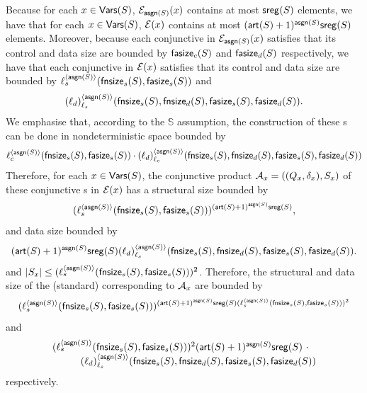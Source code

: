 Because for each $x \in \mathsf{Vars}(S)$, $\mathcal{E}_{\mathsf{asgn}(S)}(x)$ contains at most $\mathsf{sreg}(S)$ elements, we have that for each $x \in \mathsf{Vars}(S)$, $\mathcal{E}(x)$ contains at most $(\mathsf{art}(S)+1)^{\mathsf{asgn}(S)}\mathsf{sreg}(S)$ elements. 
Moreover, because each conjunctive \SA{} in $\mathcal{E}_{\mathsf{asgn}(S)}(x)$ satisfies that its control and data size are bounded by $\mathsf{fasize}_c(S)$ and $\mathsf{fasize}_d(S)$ respectively, 
we have that each conjunctive \SA{} in $\mathcal{E}(x)$ satisfies that its control and data size are bounded by $\ell_s^{\langle \mathsf{asgn}(S) \rangle}(\mathsf{fnsize}_s(S), \mathsf{fasize}_s(S))$ and 
%
\[ (\ell_d)^{\langle  \mathsf{asgn}(S) \rangle}_{\ell_s}(\mathsf{fnsize}_s(S), \mathsf{fnsize}_d(S), \mathsf{fasize}_s(S), \mathsf{fasize}_d(S)).\]
% 
We emphasise that, according to the $\mathbb{S}$\prerec{} assumption, the construction of these \SA{}s can be done in nondeterministic space bounded by
%
{
\small
$$\ell_c^{\langle  \mathsf{asgn}(S) \rangle}(\mathsf{fnsize}_s(S), \mathsf{fasize}_s(S)) \cdot (\ell_d)^{\langle \mathsf{asgn}(S) \rangle}_{\ell_c}(\mathsf{fnsize}_s(S),  \mathsf{fnsize}_d(S), \mathsf{fasize}_s(S), \mathsf{fasize}_d(S))$$
}
%
Therefore, for each $x \in \mathsf{Vars}(S)$, the conjunctive product \SA{} $\mathcal{A}_x=((Q_x, \delta_x), S_x)$ of these conjunctive \SA{}s  in $\mathcal{E}(x)$ has a structural size bounded by 
%
$$(\ell^{\langle \mathsf{asgn}(S) \rangle}_s(\mathsf{fnsize}_s(S), \mathsf{fasize}_s(S)))^{(\mathsf{art}(S)+1)^{\mathsf{asgn}(S)} \mathsf{sreg}(S)},$$
%
and data size bounded by
%
\[ (\mathsf{art}(S)+1)^{\mathsf{asgn}(S)} \mathsf{sreg}(S) (\ell_d)^{\langle  \mathsf{asgn}(S) \rangle}_{\ell_s}(\mathsf{fnsize}_s(S),\mathsf{fnsize}_d(S),  \mathsf{fasize}_s(S), \mathsf{fasize}_d(S)).\]
%
and $|S_x| \le (\ell_s^{\langle \mathsf{asgn}(S) \rangle}(\mathsf{fnsize}_s(S), \mathsf{fasize}_s(S)))^2$. 
Therefore, the structural and data size of the (standard) \SA{} corresponding to $\mathcal{A}_x$ are  bounded by 
%
$$(\ell^{\langle \mathsf{asgn}(S) \rangle}_s(\mathsf{fnsize}_s(S), \mathsf{fasize}_s(S)))^{(\mathsf{art}(S)+1)^{\mathsf{asgn}(S)} \mathsf{sreg}(S) (\ell_s^{\langle \mathsf{asgn}(S) \rangle}(\mathsf{fnsize}_s(S), \mathsf{fasize}_s(S)))^2}$$
%
and
$$
\begin{array}{l}
(\ell_s^{\langle \mathsf{asgn}(S) \rangle}(\mathsf{fnsize}_s(S), \mathsf{fasize}_s(S)))^2 (\mathsf{art}(S)+1)^{\mathsf{asgn}(S)} \mathsf{sreg}(S)\ \cdot  \\
\hspace{1cm}(\ell_d)^{\langle  \mathsf{asgn}(S) \rangle}_{\ell_s}(\mathsf{fnsize}_s(S),\mathsf{fnsize}_d(S),  \mathsf{fasize}_s(S), \mathsf{fasize}_d(S))
\end{array}
$$
respectively.

